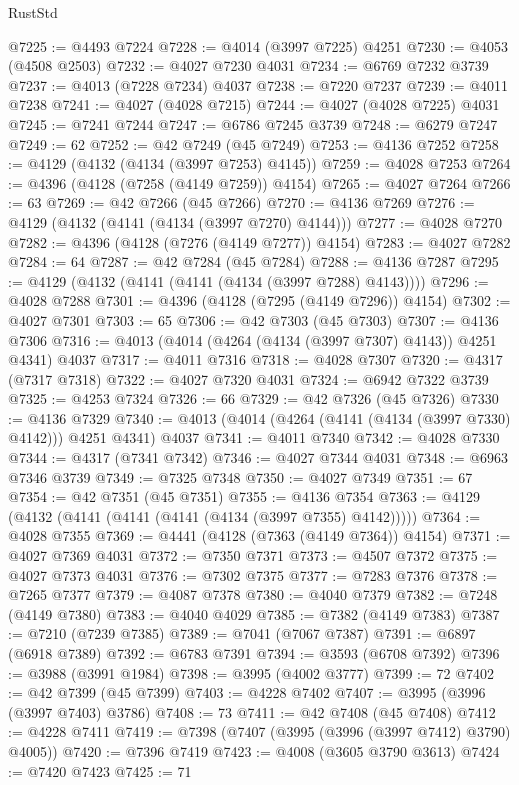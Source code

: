 \begin{lexlean}{RustStd}
\begin{coremodule}
@7225 := @4493 @7224
@7228 := @4014 (@3997 @7225) @4251
@7230 := @4053 (@4508 @2503)
@7232 := @4027 @7230 @4031
@7234 := @6769 @7232 @3739
@7237 := @4013 (@7228 @7234) @4037
@7238 := @7220 @7237
@7239 := @4011 @7238
@7241 := @4027 (@4028 @7215)
@7244 := @4027 (@4028 @7225) @4031
@7245 := @7241 @7244
@7247 := @6786 @7245 @3739
@7248 := @6279 @7247
@7249 := 62
@7252 := @42 @7249 (@45 @7249)
@7253 := @4136 @7252
@7258 := @4129 (@4132 (@4134 (@3997 @7253) @4145))
@7259 := @4028 @7253
@7264 := @4396 (@4128 (@7258 (@4149 @7259)) @4154)
@7265 := @4027 @7264
@7266 := 63
@7269 := @42 @7266 (@45 @7266)
@7270 := @4136 @7269
@7276 := @4129 (@4132 (@4141 (@4134 (@3997 @7270) @4144)))
@7277 := @4028 @7270
@7282 := @4396 (@4128 (@7276 (@4149 @7277)) @4154)
@7283 := @4027 @7282
@7284 := 64
@7287 := @42 @7284 (@45 @7284)
@7288 := @4136 @7287
@7295 := @4129 (@4132 (@4141 (@4141 (@4134 (@3997 @7288) @4143))))
@7296 := @4028 @7288
@7301 := @4396 (@4128 (@7295 (@4149 @7296)) @4154)
@7302 := @4027 @7301
@7303 := 65
@7306 := @42 @7303 (@45 @7303)
@7307 := @4136 @7306
@7316 := @4013 (@4014 (@4264 (@4134 (@3997 @7307) @4143)) @4251 @4341) @4037
@7317 := @4011 @7316
@7318 := @4028 @7307
@7320 := @4317 (@7317 @7318)
@7322 := @4027 @7320 @4031
@7324 := @6942 @7322 @3739
@7325 := @4253 @7324
@7326 := 66
@7329 := @42 @7326 (@45 @7326)
@7330 := @4136 @7329
@7340 := @4013 (@4014 (@4264 (@4141 (@4134 (@3997 @7330) @4142))) @4251 @4341) @4037
@7341 := @4011 @7340
@7342 := @4028 @7330
@7344 := @4317 (@7341 @7342)
@7346 := @4027 @7344 @4031
@7348 := @6963 @7346 @3739
@7349 := @7325 @7348
@7350 := @4027 @7349
@7351 := 67
@7354 := @42 @7351 (@45 @7351)
@7355 := @4136 @7354
@7363 := @4129 (@4132 (@4141 (@4141 (@4141 (@4134 (@3997 @7355) @4142)))))
@7364 := @4028 @7355
@7369 := @4441 (@4128 (@7363 (@4149 @7364)) @4154)
@7371 := @4027 @7369 @4031
@7372 := @7350 @7371
@7373 := @4507 @7372
@7375 := @4027 @7373 @4031
@7376 := @7302 @7375
@7377 := @7283 @7376
@7378 := @7265 @7377
@7379 := @4087 @7378
@7380 := @4040 @7379
@7382 := @7248 (@4149 @7380)
@7383 := @4040 @4029
@7385 := @7382 (@4149 @7383)
@7387 := @7210 (@7239 @7385)
@7389 := @7041 (@7067 @7387)
@7391 := @6897 (@6918 @7389)
@7392 := @6783 @7391
@7394 := @3593 (@6708 @7392)
@7396 := @3988 (@3991 @1984)
@7398 := @3995 (@4002 @3777)
@7399 := 72
@7402 := @42 @7399 (@45 @7399)
@7403 := @4228 @7402
@7407 := @3995 (@3996 (@3997 @7403) @3786)
@7408 := 73
@7411 := @42 @7408 (@45 @7408)
@7412 := @4228 @7411
@7419 := @7398 (@7407 (@3995 (@3996 (@3997 @7412) @3790) @4005))
@7420 := @7396 @7419
@7423 := @4008 (@3605 @3790 @3613)
@7424 := @7420 @7423
@7425 := 71

\end{coremodule}
\end{lexlean}
